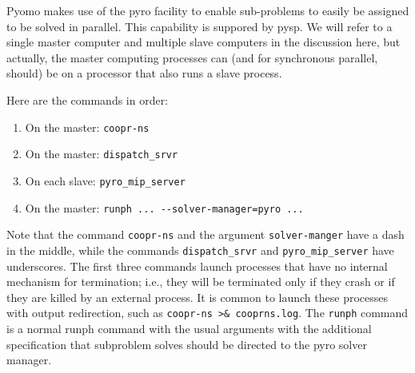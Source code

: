 Pyomo makes use of the pyro facility to enable sub-problems to easily be assigned to be solved in parallel. This capability is suppored by pysp. We will refer to a single master computer
and multiple slave computers in the discussion here, but actually, the master computing processes can (and for synchronous parallel, should) be on a 
processor that also runs a slave process.

Here are the commands in order:
\begin{enumerate}
\item On the master: \verb|coopr-ns|
\item On the master: \verb|dispatch_srvr|
\item On each slave: \verb|pyro_mip_server|
\item On the master: \verb|runph ... --solver-manager=pyro ...|
\end{enumerate}
Note that the command \verb|coopr-ns| and the argument \verb|solver-manger| have a dash in the middle, while
the commands \verb|dispatch_srvr| and \verb|pyro_mip_server| have underscores. The first three commands launch processes
that have no internal mechanism for termination; i.e., they will be terminated only if they crash or if they are 
killed by an external process. It is common to launch these processes with output redirection, such as \verb|coopr-ns >& cooprns.log|. The
\verb|runph| command is a normal runph command with the usual arguments with the additional specification that subproblem solves should
be directed to the pyro solver manager.
